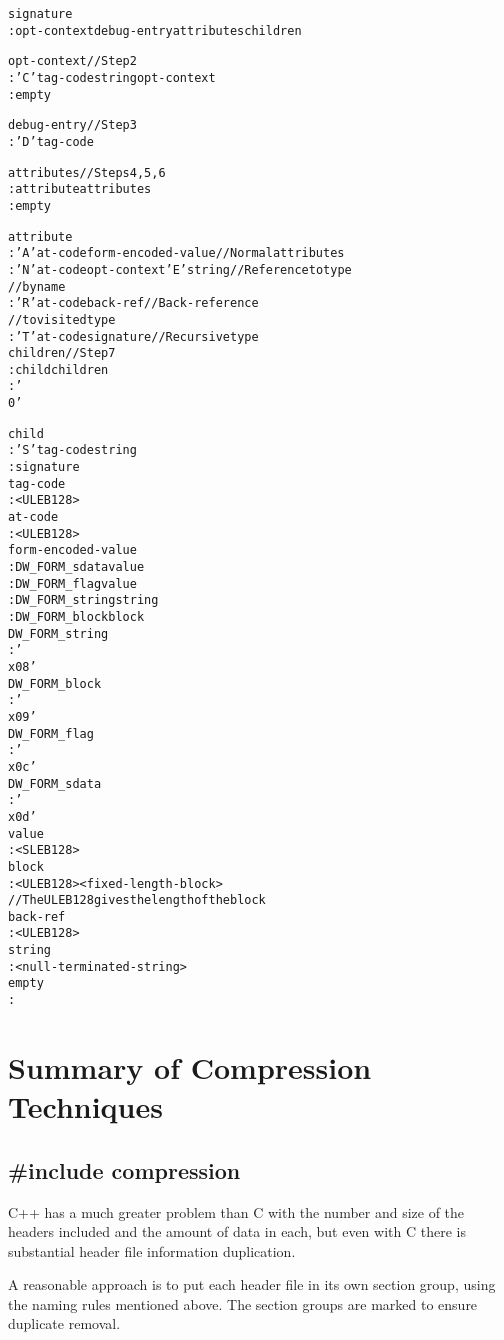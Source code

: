 \begin{alltt}
signature
    : opt-context debug-entry attributes children

opt-context           // Step 2
    : 'C' tag-code string opt-context
    : empty

debug-entry           // Step 3
    : 'D' tag-code

attributes            // Steps 4, 5, 6
    : attribute attributes
    : empty

attribute
    : 'A' at-code form-encoded-value     // Normal attributes
    : 'N' at-code opt-context 'E' string // Reference to type
                                         // by name
    : 'R' at-code back-ref               // Back-reference 
                                         // to visited type
    : 'T' at-code signature              // Recursive type
children             //  Step 7
    : child children
    : '\\0'

child
    : 'S' tag-code string
    : signature
tag-code
    : <ULEB128>
at-code
    : <ULEB128>
form-encoded-value
    : DW\_FORM\_sdata value
    : DW\_FORM\_flag value
    : DW\_FORM\_string string
    : DW\_FORM\_block block
DW\_FORM\_string
    : '\\x08'
DW\_FORM\_block
    : '\\x09'
DW\_FORM\_flag
    : '\\x0c'
DW\_FORM\_sdata
    : '\\x0d'
value
    : <SLEB128>
block
    : <ULEB128> <fixed-length-block>
                      // The ULEB128 gives the length of the block
back-ref
    : <ULEB128>
string
    : <null-terminated-string>
empty
    :
\end{alltt}


\section{Summary of Compression Techniques}
\label{app:summaryofcompressiontechniques}
\subsection{\#include compression}
\label{app:includecompression}

C++ has a much greater problem than C with the number and
size of the headers included and the amount of data in each,
but even with C there is substantial header file information
duplication.

A reasonable approach is to put each header file in its own
section group, using the naming rules mentioned above. The
section groups are marked to ensure duplicate removal.

